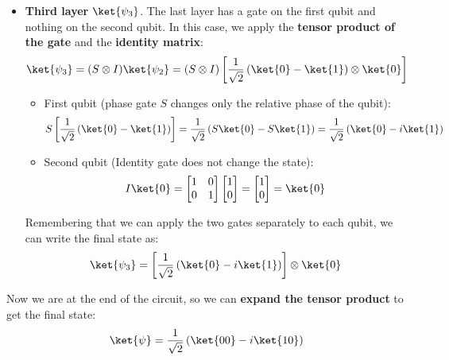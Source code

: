 \begin{itemize}
    \item \textbf{Third layer} $\ket{\psi_3}$. The last layer has a gate on the first qubit and nothing on the second qubit. In this case, we apply the \textbf{tensor product of the gate} and the \textbf{identity matrix}:
    \begin{equation*}
        \ket{\psi_3} = (S \otimes I) \ket{\psi_2} = (S \otimes I) \left[\frac{1}{\sqrt{2}} \left(\ket{0} - \ket{1}\right) \otimes \ket{0}\right]
    \end{equation*}
    \begin{itemize}
        \item First qubit (phase gate $S$ changes only the relative phase of the  qubit):
        \begin{equation*}
            S \left[\frac{1}{\sqrt{2}} \left(\ket{0} - \ket{1}\right)\right] = \frac{1}{\sqrt{2}} \left(S\ket{0} - S\ket{1}\right) = \frac{1}{\sqrt{2}} \left(\ket{0} - i \ket{1}\right)
        \end{equation*}
        \item Second qubit (Identity gate does not change the state):
        \begin{equation*}
            I \ket{0} = \begin{bmatrix}
                1 & 0 \\
                0 & 1
            \end{bmatrix} \begin{bmatrix}
                1 \\
                0
            \end{bmatrix} = \begin{bmatrix}
                1 \\
                0
            \end{bmatrix} = \ket{0}
        \end{equation*}
    \end{itemize}
    Remembering that we can apply the two gates separately to each qubit, we can write the final state as:
    \begin{equation*}
        \ket{\psi_3} = \left[\frac{1}{\sqrt{2}} \left(\ket{0} - i \ket{1}\right)\right] \otimes \ket{0}
    \end{equation*}
\end{itemize}
Now we are at the end of the circuit, so we can \textbf{expand the tensor product} to get the final state:
\begin{equation*}
    \ket{\psi} = \frac{1}{\sqrt{2}} \left(\ket{00} - i \ket{10}\right)
\end{equation*}
